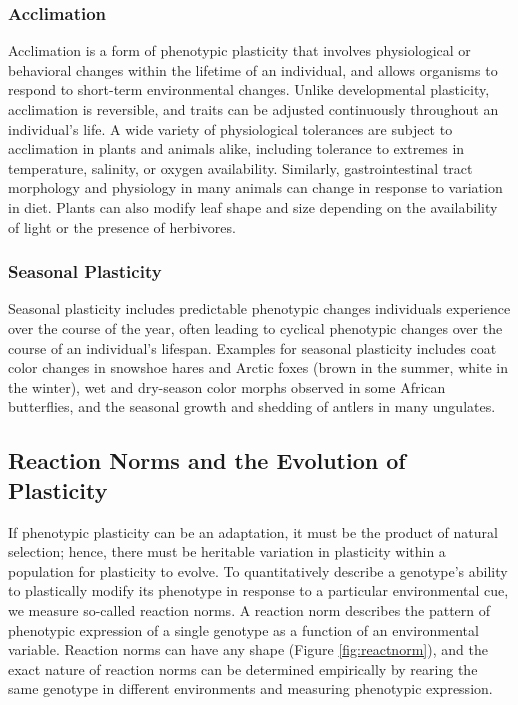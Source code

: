 \documentclass[
]{book}
\begin{document}
\hypertarget{acclimation}{%
\subsubsection*{Acclimation}\label{acclimation}}

Acclimation is a form of phenotypic plasticity that involves physiological or behavioral changes within the lifetime of an individual, and allows organisms to respond to short-term environmental changes. Unlike developmental plasticity, acclimation is reversible, and traits can be adjusted continuously throughout an individual's life. A wide variety of physiological tolerances are subject to acclimation in plants and animals alike, including tolerance to extremes in temperature, salinity, or oxygen availability. Similarly, gastrointestinal tract morphology and physiology in many animals can change in response to variation in diet. Plants can also modify leaf shape and size depending on the availability of light or the presence of herbivores.

\hypertarget{seasonal-plasticity}{%
\subsubsection*{Seasonal Plasticity}\label{seasonal-plasticity}}

Seasonal plasticity includes predictable phenotypic changes individuals experience over the course of the year, often leading to cyclical phenotypic changes over the course of an individual's lifespan. Examples for seasonal plasticity includes coat color changes in snowshoe hares and Arctic foxes (brown in the summer, white in the winter), wet and dry-season color morphs observed in some African butterflies, and the seasonal growth and shedding of antlers in many ungulates.

\hypertarget{reaction-norms-and-the-evolution-of-plasticity}{%
\subsection{Reaction Norms and the Evolution of Plasticity}\label{reaction-norms-and-the-evolution-of-plasticity}}

If phenotypic plasticity can be an adaptation, it must be the product of natural selection; hence, there must be heritable variation in plasticity within a population for plasticity to evolve. To quantitatively describe a genotype's ability to plastically modify its phenotype in response to a particular environmental cue, we measure so-called reaction norms. A reaction norm describes the pattern of phenotypic expression of a single genotype as a function of an environmental variable. Reaction norms can have any shape (Figure \ref{fig:reactnorm}), and the exact nature of reaction norms can be determined empirically by rearing the same genotype in different environments and measuring phenotypic expression.
\end{document}
